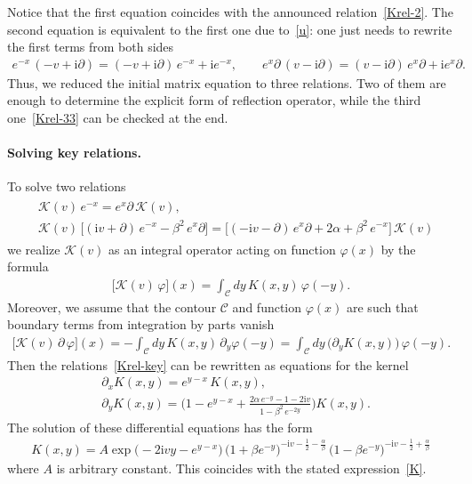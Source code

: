 \documentclass[11pt]{article}
\numberwithin{equation}{section}
\theoremstyle{plain}
\theoremstyle{definition}
\renewcommand{\phi}{\varphi}
\renewcommand{\imath}{\mathrm{i}}
\begin{document}
Notice that the first equation coincides with the announced relation~\eqref{Krel-2}. The second equation is equivalent to the first one due to~\eqref{u}: one just needs to rewrite the first terms from both sides
\begin{align}
	e^{-x}\,(-v+\imath\partial) = (-v+\imath\partial) \, e^{-x} + \imath e^{-x}, \qquad e^{x}\partial\,(v-\imath\partial) = (v-\imath\partial) \, e^{x}\partial + \imath e^{x}\partial.
\end{align}
Thus, we reduced the initial matrix equation to three relations. Two of them are enough to determine the explicit form of reflection operator, while the third one~\eqref{Krel-33} can be checked at the end. 

\paragraph{Solving key relations.} To solve two relations
\begin{align} \label{Krel-key}
	\begin{aligned}
		&\mathcal{K}(v)\,e^{-x} = e^{x}\partial\,\mathcal{K}(v), \\[6pt]  
		&\mathcal{K}(v) \, \bigl[ (\imath v + \partial)\,e^{-x} - \beta^2\,e^{x}\partial \bigr] = \bigl[ (-\imath v - \partial)\,e^{x}\partial + 2\alpha + \beta^2\,e^{-x} \bigr] \, \mathcal{K}(v)
	\end{aligned}
\end{align}
we realize $\mathcal{K}(v)$ as an integral operator acting on function $\phi(x)$ by the formula
\begin{align} \label{K-int}
\bigl[\mathcal{K}(v)\, \phi\bigr](x) = \int_{\mathcal{C}} d y \, K(x,y) \,\phi(-y).
\end{align}
Moreover, we assume that the contour $\mathcal{C}$ and function $\phi(x)$ are such that boundary terms from integration by parts vanish
\begin{align}\label{int-by-parts}
	\bigl[\mathcal{K}(v)\, \partial \, \phi\bigr](x) = - \int_{\mathcal{C}} d y \, K(x,y) \, \partial_y \phi(-y) = \int_{\mathcal{C}} d y \, \bigl( \partial_y K(x,y) \bigr) \, \phi(-y).
\end{align}
Then the relations~\eqref{Krel-key} can be rewritten as equations for the kernel 
\begin{align}\label{x}
& \partial_x K(x,y) = e^{y - x}\,K(x,y), \\[6pt]
\label{y}
& \partial_y K(x,y) = \biggl(1 - e^{y-x}+\frac{2\alpha\,e^{-y} - 1 - 2\imath v}{1 - \beta^2\,e^{-2y}}\biggr) K(x,y).
\end{align}
The solution of these differential equations has the form
\begin{align} \label{Kker}
	K(x, y) = A \exp \bigl(-2 \imath v y - e^{y -x} \bigr) \, \bigl(1 + \beta e^{-y}\bigr)^{- \imath v - \frac{1}{2} - \frac{\alpha}{\beta} } \, \bigl(1 - \beta e^{-y}\bigr)^{- \imath v - \frac{1}{2} + \frac{\alpha}{\beta}} 
\end{align}
where $A$ is arbitrary constant. This coincides with the stated expression~\eqref{K}.
\end{document}
